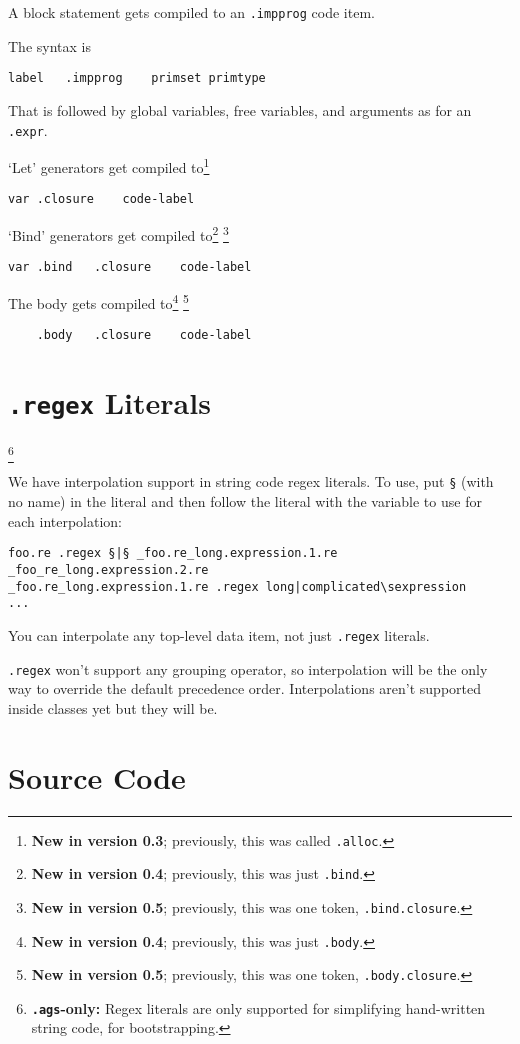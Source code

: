 \documentclass{report}
\newcommand\stringcode[1]{\texttt{#1}}
\newcommand\agsonly[1]{\footnote{\textbf{\texttt{.ags}-only: }#1}}
\newcommand\new[2]{\footnote{\textbf{New in version #1}; previously, #2}}
\begin{document}
A block statement gets compiled to an \verb+.impprog+ code item.

The syntax is
\begin{verbatim}
label	.impprog	primset	primtype
\end{verbatim}
That is followed by global variables, free variables, and arguments as for an \verb+.expr+.

`Let' generators get compiled to\new{0.3}{this was called \stringcode{.alloc}.}
\begin{verbatim}
var	.closure	code-label
\end{verbatim}
`Bind' generators get compiled to\new{0.4}{this was just \stringcode{.bind}.} \new{0.5}{this was one token, \stringcode{.bind.closure}.}
\begin{verbatim}
var	.bind	.closure	code-label
\end{verbatim}
The body gets compiled to\new{0.4}{this was just \stringcode{.body}.} \new{0.5}{this was one token, \stringcode{.body.closure}.}
\begin{verbatim}
	.body	.closure	code-label
\end{verbatim}

\chapter{\stringcode{.regex} Literals}\agsonly{Regex literals are only supported for simplifying hand-written string code, for bootstrapping.}

We have interpolation support in string code regex literals.
To use, put \stringcode{§} (with no name) in the literal
and then follow the literal with the variable to use for each interpolation:
\begin{verbatim}
foo.re .regex §|§ _foo.re_long.expression.1.re _foo_re_long.expression.2.re
_foo.re_long.expression.1.re .regex long|complicated\sexpression
...
\end{verbatim}

You can interpolate any top-level data item, not just \stringcode{.regex} literals.

\stringcode{.regex} won't support any grouping operator,
so interpolation will be the only way to override the default precedence order.
Interpolations aren't supported inside classes yet but they will be.

\chapter{Source Code}
\end{document}
